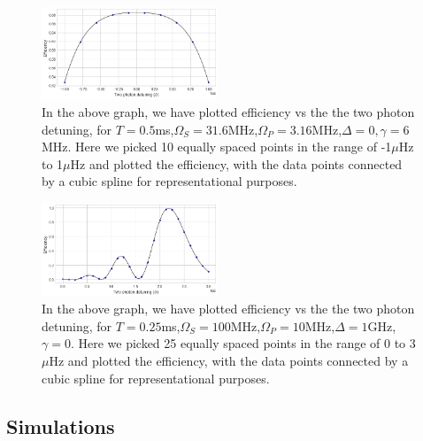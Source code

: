 \documentclass[%
 reprint,
 amsmath,amssymb,
 aps,
]{revtex4-2}
\begin{document}
\begin{figure}[ht]
    \centering
    \includegraphics[width=0.47\textwidth]{images/detuning 1.png}
    \caption{In the above graph, we have plotted efficiency vs the the two photon detuning, for $T=0.5$ms,$\Omega_S=31.6$MHz,$\Omega_P=3.16$MHz,$\Delta=0,\gamma=6$MHz. Here we picked 10 equally spaced points in the range of -1$\mu$Hz to 1$\mu$Hz and plotted the efficiency, with the data points connected by a cubic spline for representational purposes.}
\end{figure}
\begin{figure}[ht]
    \centering
    \includegraphics[width=0.47\textwidth]{images/detuning 2.png}
    \caption{In the above graph, we have plotted efficiency vs the the two photon detuning, for $T=0.25$ms,$\Omega_S=100$MHz,$\Omega_P=10$MHz,$\Delta=1$GHz,$\gamma=$0. Here we picked 25 equally spaced points in the range of 0 to 3$\mu$Hz and plotted the efficiency, with the data points connected by a cubic spline for representational purposes.}
\end{figure}

\subsection{Simulations}
\end{document}
